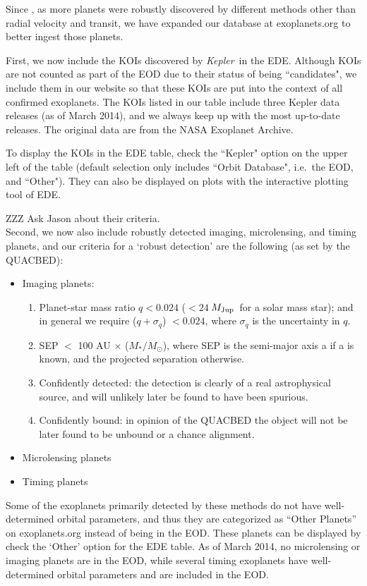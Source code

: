 \documentclass[11pt,preprint]{aastex}
\def\kepler{\textit{Kepler}}
\def\mjup{$M_{\rm Jup}$}
\begin{document}
\begin{CJK*}{UTF8}{gbsn}
Since \cite{Wright2011}, as more planets were robustly discovered by
different methods other than radial velocity and transit, we have
expanded our database at exoplanets.org to better ingest those
planets.

First, we now include the KOIs discovered by \kepler\ in the
EDE. Although KOIs are not counted as part of the EOD due to their
status of being ``candidates", we include them in our website so that
these KOIs are put into the context of all confirmed exoplanets. The
KOIs listed in our table include three Kepler data releases (as of
March 2014), and we always keep up with the most up-to-date
releases. The original data are from the NASA Exoplanet Archive.

To display the KOIs in the EDE table, check the ``Kepler" option on the
upper left of the table (default selection only includes ``Orbit
Database", i.e.~the EOD, and ``Other"). They can also be displayed on
plots with the interactive plotting tool of EDE.

ZZZ Ask Jason about their criteria. \\ Second, we now also include
robustly detected imaging, microlensing, and timing planets, and our
criteria for a `robust detection' are the following (as set by the
QUACBED):

\begin{itemize}
\item Imaging planets:
\begin{enumerate}
\item Planet-star mass ratio $q < 0.024$ ($< 24\ $\mjup\ for a solar
  mass star); and in general we require ($q+\sigma_q$) $< 0.024$,
  where $\sigma_q$ is the uncertainty in $q$.
\item SEP $<$ 100 AU $\times$ ($M_*/M_\odot$), where SEP is the
  semi-major axis a if a is known, and the projected separation
  otherwise.
\item Confidently detected: the detection is clearly of a real
  astrophysical source, and will unlikely later be found to have been
  spurious.
\item Confidently bound: in opinion of the QUACBED the object will not
  be later found to be unbound or a chance alignment.

\end{enumerate}
\item Microlensing planets

\item Timing planets

\end{itemize}
Some of the exoplanets primarily detected by these methods do not have
well-determined orbital parameters, and thus they are categorized as
``Other Planets'' on exoplanets.org instead of being in the EOD. These
planets can be displayed by check the `Other' option for the EDE
table. As of March 2014, no microlensing or imaging planets are in the
EOD, while several timing exoplanets have well-determined orbital
parameters and are included in the EOD.



\end{CJK*}
\end{document}
